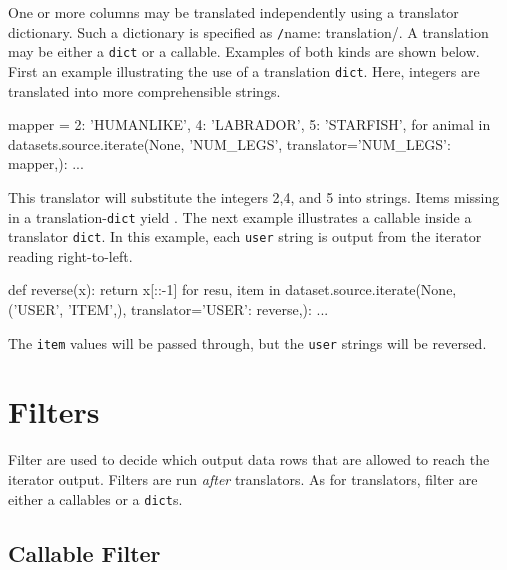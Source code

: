 One or more columns may be translated independently using a translator
dictionary.  Such a dictionary is specified
as \texttt/{name: translation}/.  A translation may be
either a \texttt{dict} or a callable.  Examples of both kinds are
shown below.  First an example illustrating the use of a
translation \texttt{dict}.  Here, integers are translated into more
comprehensible strings.
\begin{python}
mapper = {2: 'HUMANLIKE', 4: 'LABRADOR', 5: 'STARFISH',}
for animal in datasets.source.iterate(None, 'NUM_LEGS',
                                      translator={'NUM_LEGS': mapper,}):
    ...
\end{python}
This translator will substitute the integers 2,4, and 5 into strings.
Items missing in a translation-\texttt{dict} yield \pyNone.  The next
example illustrates a callable inside a translator \texttt{dict}.  In
this example, each \texttt{user} string is output from the iterator
reading right-to-left.
\begin{python}
def reverse(x):
    return x[::-1]
for resu, item in dataset.source.iterate(None, ('USER', 'ITEM',),
                                         translator={'USER': reverse,}):
    ...
\end{python}
The \texttt{item} values will be passed through, but the \texttt{user}
strings will be reversed.



\section{Filters}
Filter are used to decide which output data rows that are allowed to
reach the iterator output.  Filters are run \emph{after} translators.
As for translators, filter are either a callables or a \texttt{dict}s.




\subsection*{Callable Filter}

